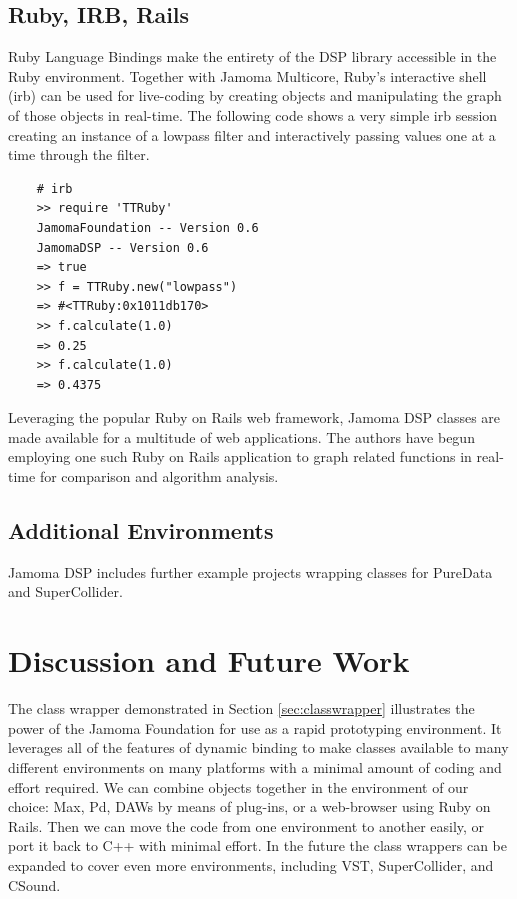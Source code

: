 \documentclass[twoside,10pt]{article}
\begin{document}
\subsection{Ruby, IRB, Rails}
Ruby Language Bindings make the entirety of the DSP library accessible in the Ruby environment.  Together with Jamoma Multicore, Ruby's interactive shell (irb) can be used for live-coding by creating objects and manipulating the graph of those objects in real-time.  The following code shows a very simple irb session creating an instance of a lowpass filter and interactively passing values one at a time through the filter.

\begin{lstlisting}
    # irb
    >> require 'TTRuby'
    JamomaFoundation -- Version 0.6
    JamomaDSP -- Version 0.6
    => true
    >> f = TTRuby.new("lowpass")
    => #<TTRuby:0x1011db170>
    >> f.calculate(1.0)
    => 0.25
    >> f.calculate(1.0)
    => 0.4375
\end{lstlisting}

\noindent Leveraging the popular Ruby on Rails web framework, Jamoma DSP classes are made available for a multitude of web applications.  The authors have begun employing one such Ruby on Rails application to graph related functions in real-time for comparison and algorithm analysis.



\subsection{Additional Environments}

Jamoma DSP includes further example projects wrapping classes for PureData and SuperCollider.




\section{Discussion and Future Work} %

The class wrapper demonstrated in Section \ref{sec:classwrapper} illustrates the power of the Jamoma Foundation for use as a rapid prototyping environment.  It leverages all of the features of dynamic binding to make classes available to many different environments on many platforms with a minimal amount of coding and effort required.  We can combine objects together in the environment of our choice: Max, Pd, DAWs by means of plug-ins, or a web-browser using Ruby on Rails.  Then we can move the code from one environment to another easily, or port it back to C++ with minimal effort. In the future the class wrappers can be expanded to cover even more environments, including VST, SuperCollider, and CSound.
\end{document}
